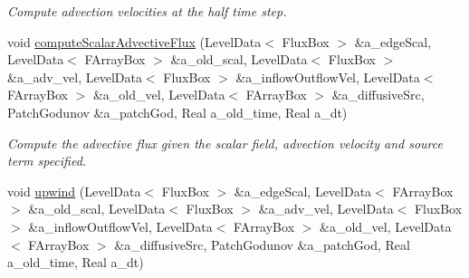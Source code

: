 \begin{DoxyCompactItemize}
\begin{DoxyCompactList}\small\item\em Compute advection velocities at the half time step. \end{DoxyCompactList}\item 
void \hyperlink{class_a_m_r_level_mushy_layer_a77914a8f6be67642c366b4da8e0a2829}{compute\-Scalar\-Advective\-Flux} (Level\-Data$<$ Flux\-Box $>$ \&a\-\_\-edge\-Scal, Level\-Data$<$ F\-Array\-Box $>$ \&a\-\_\-old\-\_\-scal, Level\-Data$<$ Flux\-Box $>$ \&a\-\_\-adv\-\_\-vel, Level\-Data$<$ Flux\-Box $>$ \&a\-\_\-inflow\-Outflow\-Vel, Level\-Data$<$ F\-Array\-Box $>$ \&a\-\_\-old\-\_\-vel, Level\-Data$<$ F\-Array\-Box $>$ \&a\-\_\-diffusive\-Src, Patch\-Godunov \&a\-\_\-patch\-God, Real a\-\_\-old\-\_\-time, Real a\-\_\-dt)
\begin{DoxyCompactList}\small\item\em Compute the advective flux given the scalar field, advection velocity and source term specified. \end{DoxyCompactList}\item 
\hypertarget{class_a_m_r_level_mushy_layer_a6d02158d0d0bc38c7d7841f526b6a5f8}{void \hyperlink{class_a_m_r_level_mushy_layer_a6d02158d0d0bc38c7d7841f526b6a5f8}{upwind} (Level\-Data$<$ Flux\-Box $>$ \&a\-\_\-edge\-Scal, Level\-Data$<$ F\-Array\-Box $>$ \&a\-\_\-old\-\_\-scal, Level\-Data$<$ Flux\-Box $>$ \&a\-\_\-adv\-\_\-vel, Level\-Data$<$ Flux\-Box $>$ \&a\-\_\-inflow\-Outflow\-Vel, Level\-Data$<$ F\-Array\-Box $>$ \&a\-\_\-old\-\_\-vel, Level\-Data$<$ F\-Array\-Box $>$ \&a\-\_\-diffusive\-Src, Patch\-Godunov \&a\-\_\-patch\-God, Real a\-\_\-old\-\_\-time, Real a\-\_\-dt)}\label{class_a_m_r_level_mushy_layer_a6d02158d0d0bc38c7d7841f526b6a5f8}


\end{DoxyCompactItemize}
